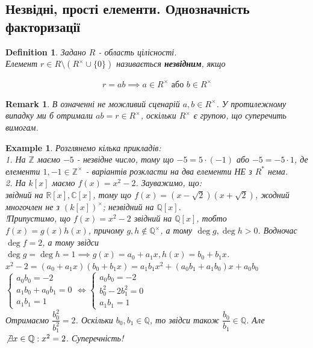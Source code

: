\documentclass[a4paper, 10pt]{article}
\theoremstyle{theoremdd}
\theoremstyle{theoremdd}
\newtheorem{definition}[theorem]{Definition}
\theoremstyle{theoremdd}
\theoremstyle{theoremdd}
\newtheorem{example}[theorem]{Example}
\theoremstyle{theoremdd}
\theoremstyle{theoremdd}
\newtheorem{remark}[theorem]{Remark}
\theoremstyle{theoremdd}
\theoremstyle{theoremdd}
\begin{document}
\subsection{Незвідні, прості елементи. Однозначність факторизації}
\begin{definition}
Задано $R$ - область цілісності.\\
Елемент $r \in R \setminus (R^\times \cup \{0\})$ називається \textbf{незвідним}, якщо

\begin{align*}
r = ab \implies a \in R^\times \text{ або } b \in R^\times
\end{align*}
\end{definition}

\begin{remark}
В означенні не можливий сценарій $a,b \in R^\times$. У протилежному випадку ми б отримали $ab = r \in R^\times$, оскільки $R^\times$ є групою, що суперечить вимогам.
\end{remark}

\begin{example}
Розглянемо кілька прикладів:\\
1. На $\mathbb{Z}$ маємо $-5$ - незвідне число, тому що $-5 = 5 \cdot (-1)$ або $-5 = -5 \cdot 1$, де елементи $1,-1 \in \mathbb{Z}^\times$ - варіантів розкласти на два елементи НЕ з $R^*$ нема.
\bigskip \\
2. На $k[x]$ маємо $f(x) = x^2 - 2$. Зауважимо, що:\\
звідний на $\mathbb{R}[x], \mathbb{C}[x]$, тому що $f(x) = (x-\sqrt{2})(x+\sqrt{2})$, жодний многочлен не з $(k[x])^\times$;
незвідний на $\mathbb{Q}[x]$.
\bigskip \\
!Припустимо, що $f(x) = x^2-2$ звідний на $\mathbb{Q}[x]$, тобто $f(x) = g(x)h(x)$, причому $g,h \not \in \mathbb{Q}^\times$, а тому $\deg g, \deg h > 0$. Водночас $\deg f = 2$, а тому звідси $\deg g = \deg h = 1 \implies g(x) = a_0 + a_1x, h(x) = b_0 + b_1x$.\\
$x^2 - 2 = (a_0+a_1x)(b_0+b_1x) = a_1b_1x^2 + (a_0b_1+a_1b_0)x + a_0b_0$\\
$\begin{cases} 
a_0b_0 = -2 \\
a_1b_0+a_0b_1 = 0 \\
a_1b_1 = 1
\end{cases} \iff \begin{cases} 
a_0b_0 = -2 \\
b_0^2-2b_1^2 = 0 \\
a_1b_1 = 1
\end{cases}$\\
Отримаємо $\dfrac{b_0^2}{b_1^2} = 2$. Оскільки $b_0,b_1 \in \mathbb{Q}$, то звідси також $\dfrac{b_0}{b_1} \in \mathbb{Q}$. Але $\not\exists x \in \mathbb{Q}: x^2 = 2$. Суперечність!
\end{example}
\end{document}
